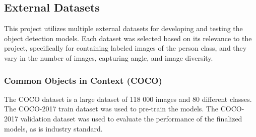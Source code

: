\subsection{External Datasets}
\label{sec:external_datasets}
This project utilizes multiple external datasets for developing and testing the object detection models. Each dataset was selected based on its relevance to the project, specifically for containing labeled images of the person class, and they vary in the number of images, capturing angle, and image diversity.

\subsubsection{Common Objects in Context (COCO)}
\label{sec:dataset_COCO}
The COCO dataset is a large dataset of 118 000 images and 80 different classes. The COCO-2017 train dataset was used to pre-train the models. The COCO-2017 validation dataset was used to evaluate the performance of the finalized models, as is industry standard.

